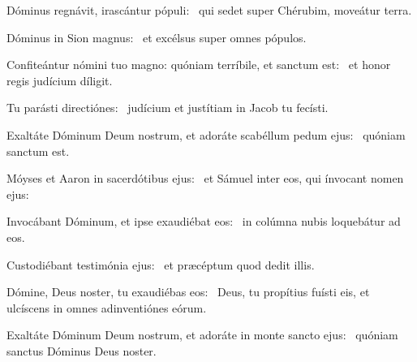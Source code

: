 \item Dóminus regnávit, irascántur pópuli:~\psstar{} qui sedet super Chérubim, moveátur terra.

\item Dóminus in Sion magnus:~\psstar{} et excélsus super omnes pópulos.

\item Confiteántur nómini tuo magno: quóniam terríbile, et sanctum est:~\psstar{} et honor regis judícium díligit.

\item Tu parásti directiónes:~\psstar{} judícium et justítiam in Jacob tu fecísti.

\item Exaltáte Dóminum Deum nostrum, et adoráte scabéllum pedum ejus:~\psstar{} quóniam sanctum est.

\item Móyses et Aaron in sacerdótibus ejus:~\psstar{} et Sámuel inter eos, qui ínvocant nomen ejus:

\item Invocábant Dóminum, et ipse exaudiébat eos:~\psstar{} in colúmna nubis loquebátur ad eos.

\item Custodiébant testimónia ejus:~\psstar{} et præcéptum quod dedit illis.

\item Dómine, Deus noster, tu exaudiébas eos:~\psstar{} Deus, tu propítius fuísti eis, et ulcíscens in omnes adinventiónes eórum.

\item Exaltáte Dóminum Deum nostrum, et adoráte in monte sancto ejus:~\psstar{} quóniam sanctus Dóminus Deus noster.

